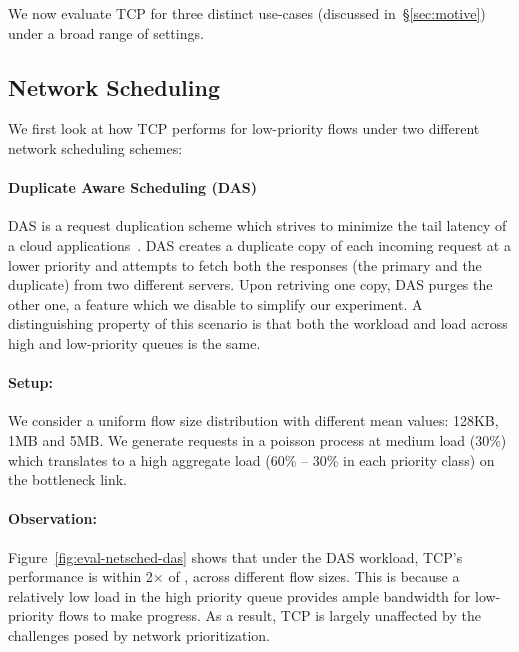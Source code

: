 We now evaluate TCP for three distinct use-cases (discussed in~\S\ref{sec:motive}) under a broad range of settings. 

\subsection{\textbf{Network Scheduling}}
\label{sec:eval-netsched}
We first look at how TCP performs for low-priority flows under two different network scheduling schemes:

\paragraph{\textbf{Duplicate Aware Scheduling (DAS)}}
DAS is a request duplication scheme which strives to minimize the tail latency of a cloud applications~\cite{das}.
DAS creates a duplicate copy of each incoming request at a lower priority and attempts to fetch both the responses (the primary and the duplicate) from two different servers. Upon retriving one copy, DAS purges the other one, a feature which we disable to simplify our experiment. 
A distinguishing property of this scenario is that both the workload and load across high and low-priority queues is the same.

\paragraph{Setup:} We consider a uniform flow size distribution with different mean values: 128KB, 1MB and 5MB.
We generate requests in a poisson process at medium load (30\%) which translates to a high aggregate load (60\% -- 30\% in each priority class) on the bottleneck link.


\paragraph{Observation:}
Figure~\ref{fig:eval-netsched-das} shows that under the DAS workload, TCP's performance is within 2$\times$ of \nearopt{}, across different flow sizes. 
This is because a relatively low load in the high priority queue provides ample bandwidth for low-priority flows to make progress. As a result, TCP is largely unaffected by the challenges posed by network prioritization.


